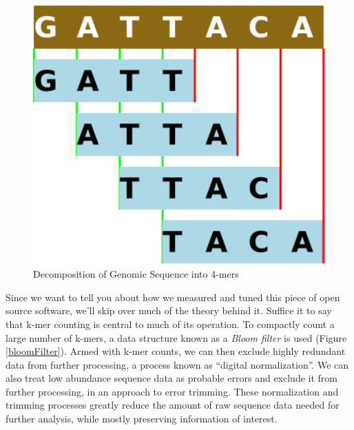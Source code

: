 \documentclass{article}
\begin{document}
\begin{figure}[ht!]
\centering
\includegraphics[scale=0.5]{kmers.pdf}
\caption{Decomposition of Genomic Sequence into 4-mers}
\label{kmers}
\end{figure}


Since we want to tell you about how we measured and tuned this piece of open
source software, we'll skip over much of the theory behind it. Suffice it to
say that k-mer counting is central to much of its operation. To compactly count
a large number of k-mers, a data structure known as a \textit{Bloom filter}
\citep{web:BloomFilter} is used (Figure \ref{bloomFilter}). Armed with k-mer counts, we can then exclude
highly redundant data from further processing, a process known as
``digital normalization''. We can also treat low
abundance sequence data as probable errors and exclude it from further
processing, in an approach to error trimming.  These normalization and
trimming processes greatly reduce
the amount of raw sequence data needed for further analysis, while mostly
preserving information of interest.
\end{document}
